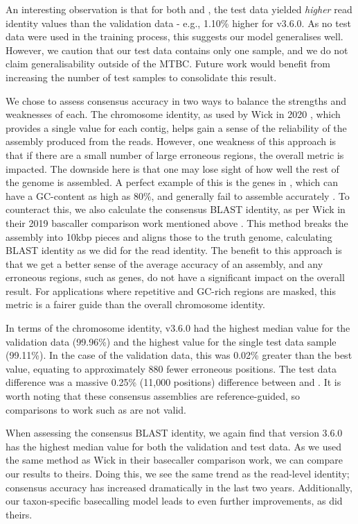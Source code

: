 An interesting observation is that for both \guppy{} and \tubby{}, the test data yielded \emph{higher} read identity values than the validation data - e.g., 1.10\% higher for \tubby{} v3.6.0. As no test data were used in the training process, this suggests our model generalises well. However, we caution that our test data contains only one sample, and we do not claim generalisability outside of the MTBC. Future work would benefit from increasing the number of test samples to consolidate this result.

\noindent
We chose to assess consensus accuracy in two ways to balance the strengths and weaknesses of each. The chromosome identity, as used by Wick \etal{} in 2020 \cite{wick2020}, which provides a single value for each contig, helps gain a sense of the reliability of the assembly produced from the \ont{} reads. However, one weakness of this approach is that if there are a small number of large erroneous regions, the overall metric is impacted. The downside here is that one may lose sight of how well the rest of the genome is assembled. A perfect example of this is the \ppe{} genes in \mtb{}, which can have a GC-content as high as 80\%, and generally fail to assemble accurately \cite{Phelan2016}.  To counteract this, we also calculate the consensus BLAST identity, as per Wick \etal{} in their 2019 bascaller comparison work mentioned above \cite{wick2019}. This method breaks the assembly into 10kbp pieces and aligns those to the truth genome, calculating BLAST identity as we did for the read identity. The benefit to this approach is that we get a better sense of the average accuracy of an assembly, and any erroneous regions, such as \ppe{} genes, do not have a significant impact on the overall result. For applications where repetitive and GC-rich regions are masked, this metric is a fairer guide than the overall chromosome identity.

In terms of the chromosome identity, \tubby{} v3.6.0 had the highest median value for the validation data (99.96\%) and the highest value for the single test data sample (99.11\%). In the case of the validation data, this was 0.02\% greater than the best \guppy{} value, equating to approximately 880 fewer erroneous positions. The test data difference was a massive 0.25\% (11,000 positions) difference between \tubby{} and \guppy{}. It is worth noting that these consensus assemblies are reference-guided, so comparisons to work such as \cite{wick2020} are not valid.

When assessing the consensus BLAST identity, we again find that \tubby{} version 3.6.0 has the highest median value for both the validation and test data. As we used the same method as Wick \etal{} in their basecaller comparison work, we can compare our results to theirs. Doing this, we see the same trend as the read-level identity; consensus accuracy has increased dramatically in the last two years. Additionally, our taxon-specific basecalling model leads to even further improvements, as did theirs. 

